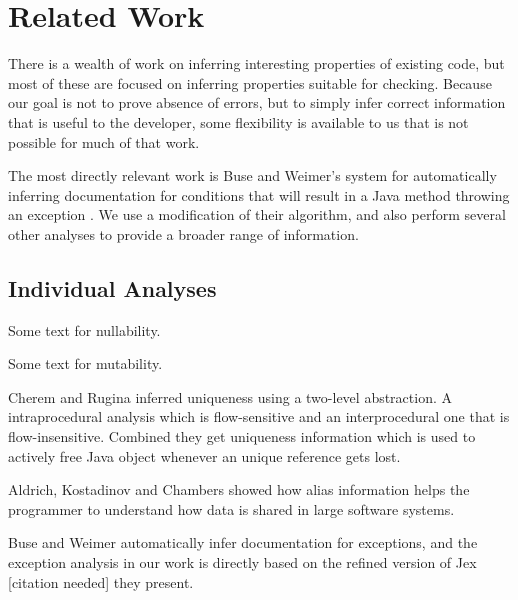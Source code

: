 \section{Related Work}
There is a wealth of work on inferring interesting properties of existing code,
but most of these are focused on inferring properties suitable for checking.
Because our goal is not to prove absence of errors, but to simply infer correct
information that is useful to the developer, some flexibility is available to us
that is not possible for much of that work.

The most directly relevant work is Buse and Weimer's system for automatically
inferring documentation for conditions that will result in a Java method
throwing an exception \cite{autodoc}.  We use a modification of their
algorithm, and also perform several other analyses to provide a broader range
of information.

\subsection{Individual Analyses}
Some text for nullability.

Some text for mutability.

Cherem and Rugina \cite{UniquenessInference} inferred uniqueness using a two-level
abstraction. A intraprocedural analysis which is flow-sensitive and an interprocedural
one that is flow-insensitive. Combined they get uniqueness information
which is used to actively free Java object whenever an unique reference gets lost.

Aldrich, Kostadinov and Chambers \cite{AliasJava} showed how alias information 
helps the programmer to understand how data is shared in large software systems.

Buse and Weimer \cite{autodoc} automatically infer documentation for
exceptions, and the exception analysis in our work is directly based on the
refined version of {\sc Jex} [citation needed] they present.
